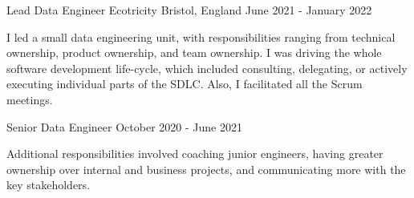 \begin{cventries}

  \cventry
    {Lead Data Engineer} 
    {Ecotricity} 
    {Bristol, England} 
    {June 2021 - January 2022}
    {
        \begin{cvitems} 
            \item {I led a small data engineering unit, with responsibilities ranging from technical ownership, product ownership, and team ownership. I was driving the whole software development life-cycle, which included consulting, delegating, or actively executing individual parts of the SDLC. Also, I facilitated all the Scrum meetings.}
        \end{cvitems}
 	}
  
  \cventry
    {Senior Data Engineer}
    {} %
    {} %
    {October 2020 - June 2021} %
    {
      \begin{cvitems}
        \item {Additional responsibilities involved coaching junior engineers, having greater ownership over internal and business projects, and communicating more with the key stakeholders.}
        \end{cvitems}
 	}
 	


\end{cventries}
